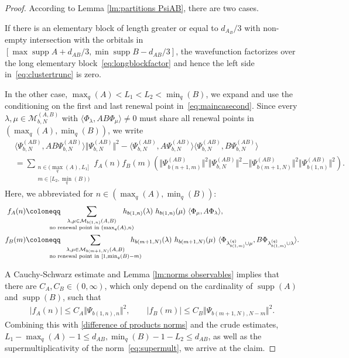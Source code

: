 \documentclass[letterpaper, DIV=17]{scrartcl}
\numberwithin{equation}{section}
\theoremstyle{definition}
\DeclareMathOperator{\supp}{supp}
\begin{document}
\begin{proof}
	According to Lemma \ref{lm:partitions PsiAB}, there are two cases. 
	
	If there is an elementary block of length greater or equal to $ d_{A_B}/ 3 $ with non-empty intersection with the orbitals in $ [ \max \supp A + d_{AB}/3 , \min \supp B - d_{AB}/3]$, the wavefunction factorizes over the long elementary block~\eqref{eq:longblockfactor} and hence the left side in~\eqref{eq:clustertrunc} is zero. 
	
	In the other case,  $\max_q(A) < L_1 < L_2 < \min_q(B) $, we expand and use the conditioning on the first and last renewal point in~\eqref{eq:maincasecond}. Since every $\lambda, \mu\in \mathcal{M}_{b,N}^{(A,B)}$ with $\langle \Phi_{\lambda}, AB \Phi_\mu\rangle\neq 0$ must share all renewal points in $(\max_q(A), \min_q(B))$, we write
		\begin{align*}
		&\langle \Psi_{b,N}^{(AB)}, AB \Psi_{b, N}^{(AB)} \rangle \Vert \Psi_{b,N}^{(AB)} \Vert^2 - \langle \Psi_{b,N}^{(AB)}, A \Psi_{b, N}^{(AB)} \rangle \langle \Psi_{b,N}^{(AB)}, B \Psi_{b, N}^{(AB)} \rangle \\
		&= \sum_{\substack{n\in (\max_q(A), L_1] \\ m\in [L_2, \min_q(B))}}
			f_A(n) f_B(m) \left( \Vert \Psi_{b(n+1,m)}^{(AB)} \Vert^2 \Vert \Psi_{b,N}^{(AB)}\Vert^2 - \Vert \Psi_{b(m+1,N)}^{(AB)}\Vert^2 \Vert \Psi_{b(1,n)}^{(AB)} \Vert^2\right).
	\end{align*}
	Here, we abbreviated  for $n\in (\max_q(A), \min_q(B))$:
\begin{align*}
		f_A(n) &\coloneqq \mkern-30mu \sum_{\substack{\lambda, \mu\in \mathcal{M}_{b(1,n)}(A,B)\\ \text{no renewal point in } (\max_q(A), n)}}  \mkern-30mu h_{b(1,n)}(\lambda) \   h_{b(1,n)}(\mu) \ \langle \Phi_\mu, A \Phi_\lambda \rangle, \\
		f_B(m) & \coloneqq  \mkern-30mu \sum_{\substack{\lambda, \mu\in \mathcal{M}_{b(m+1,N)}(A,B) \\ \text{no renewal point in } [1,\min_q(B)-m)}}  \mkern-30mu h_{b(m+1,N)}(\lambda) \ h_{b(m+1,N)}(\mu) \ \langle \Phi_{\lambda^{(q)}_{b(1,m)} \cup\mu}, B \Phi_{\lambda_{b(1,m)}^{(q)}\cup \lambda} \rangle. 
\end{align*}

	

	


	A Cauchy-Schwarz estimate and Lemma \ref{lm:norms observables} implies that there are  $C_A, C_B \in (0,\infty)$, which  only depend on the cardinality of $\supp (A)$ and $\supp(B)$, such that 
	\begin{align*}
		\vert f_A(n) \vert \leq C_A \Vert \Psi_{b(1,n), n}\Vert^2, \qquad 
		\vert f_B(m) \vert \leq C_B \Vert \Psi_{b(m+1,N), N-m}\Vert^2.
	\end{align*}
	Combining this with \eqref{difference of products norms} and the crude estimates, $L_1-\max_q(A)-1\leq d_{AB}, \min_q(B)-1-L_2\leq d_{AB}$, as well as the supermultiplicativity of the norm~\eqref{eq:supermult}, we arrive at the claim.
\end{proof}
\end{document}
